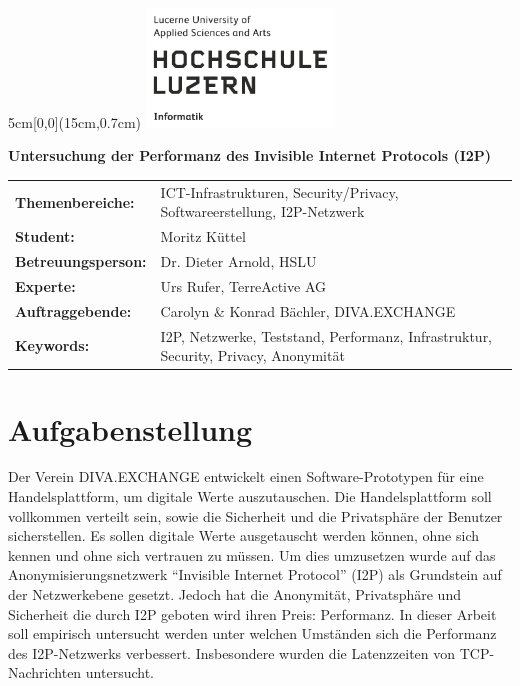 \documentclass[
	a4paper,10pt
]{scrartcl}
\begin{document}

\begin{textblock*}{5cm}[0,0](15cm,0.7cm)
	\includegraphics[keepaspectratio,width=5cm]{img/HSLU_Logo}
\end{textblock*}

\vspace*{2cm}

\noindent
\textbf{\LARGE{Untersuchung der Performanz des Invisible Internet Protocols (I2P)}} \\

\vspace{0.5em}

\bgroup
\setlength\tabcolsep{0cm}

\begin{large}
\noindent
\begin{tabularx}{\textwidth}{p{5cm}X}
    \textbf{Themenbereiche:} & ICT-Infrastrukturen, Security/Privacy,
                    Softwareerstellung, I2P-Netzwerk \\
	\textbf{Student:} & Moritz Küttel\\
	\textbf{Betreuungsperson:} & Dr. Dieter Arnold, HSLU\\
	\textbf{Experte:} & Urs Rufer, TerreActive AG\\
    \textbf{Auftraggebende:} & Carolyn 
    \& Konrad Bächler, DIVA.EXCHANGE\\
	\textbf{Keywords:} & I2P, Netzwerke, Teststand, Performanz, Infrastruktur, Security, Privacy, Anonymität \\
\end{tabularx}
\end{large}
\egroup

\section{Aufgabenstellung}

Der Verein DIVA.EXCHANGE entwickelt einen Software-Prototypen für eine Handelsplattform, um digitale Werte auszutauschen.
Die Handelsplattform soll vollkommen verteilt sein, sowie die Sicherheit und die Privatsphäre der Benutzer sicherstellen.
Es sollen digitale Werte ausgetauscht werden können, ohne sich kennen und ohne sich vertrauen zu müssen.
Um dies umzusetzen wurde auf das Anonymisierungsnetzwerk ``Invisible Internet Protocol'' (I2P) als Grundstein auf der Netzwerkebene gesetzt.
Jedoch hat die Anonymität, Privatsphäre und Sicherheit die durch I2P geboten wird ihren Preis: Performanz.
In dieser Arbeit soll empirisch untersucht werden unter welchen Umständen sich die Performanz des I2P-Netzwerks verbessert.
Insbesondere wurden die Latenzzeiten von TCP-Nachrichten untersucht.
\end{document}
